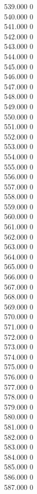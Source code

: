 { 539.000	0 \\
 540.000	0 \\
 541.000	0 \\
 542.000	0 \\
 543.000	0 \\
 544.000	0 \\
 545.000	0 \\
 546.000	0 \\
 547.000	0 \\
 548.000	0 \\
 549.000	0 \\
 550.000	0 \\
 551.000	0 \\
 552.000	0 \\
 553.000	0 \\
 554.000	0 \\
 555.000	0 \\
 556.000	0 \\
 557.000	0 \\
 558.000	0 \\
 559.000	0 \\
 560.000	0 \\
 561.000	0 \\
 562.000	0 \\
 563.000	0 \\
 564.000	0 \\
 565.000	0 \\
 566.000	0 \\
 567.000	0 \\
 568.000	0 \\
 569.000	0 \\
 570.000	0 \\
 571.000	0 \\
 572.000	0 \\
 573.000	0 \\
 574.000	0 \\
 575.000	0 \\
 576.000	0 \\
 577.000	0 \\
 578.000	0 \\
 579.000	0 \\
 580.000	0 \\
 581.000	0 \\
 582.000	0 \\
 583.000	0 \\
 584.000	0 \\
 585.000	0 \\
 586.000	0 \\
 587.000	0 \\
}
